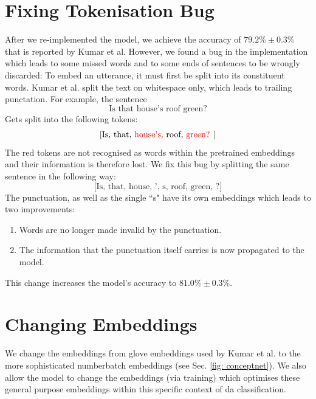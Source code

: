     \section{Fixing Tokenisation Bug \label{sec: method tokenisation bug}}
        After we re-implemented the \gls{model}, we achieve the accuracy of $79.2\% \pm 0.3\%$ that is reported by Kumar et al. However, we found a bug in the implementation which leads to some missed words and to some ends of sentences to be wrongly discarded: To embed an \gls{utterance}, it must first be split into its constituent words. Kumar et al. split the text on whitespace only, which leads to trailing punctation. For example, the sentence
        \begin{equation*}
            \text{Is that house's roof green?}
        \end{equation*}
        Gets split into the following tokens:
        \begin{equation*}
            \text{[Is, that, \color{red} house's, \color{black} roof, \color{red} green? \color{black}]}
        \end{equation*}
        The red tokens are not recognised as words within the pretrained \glspl{embedding} and their information is therefore lost. We fix this bug by splitting the same sentence in the following way:
        \begin{equation*}
            \text{[Is, that, house, ', s, roof, green, ?]}
        \end{equation*}
        The punctuation, as well as the single ``s" have its own \glspl{embedding} which leads to two improvements:
        \begin{enumerate}
            \item Words are no longer made invalid by the punctuation.
            \item The information that the punctuation itself carries is now propagated to the \gls{model}.
        \end{enumerate}
        This change increases the \gls{model}'s accuracy to $81.0\% \pm 0.3\%$.



    \section{Changing Embeddings}
    We change the \glspl{embedding} from \gls{glove} \glspl{embedding} used by Kumar et al.\cite{kumar2017dialogue} to the more sophisticated \gls{numberbatch} \glspl{embedding} (see Sec. \ref{fig: conceptnet}). We also allow the \gls{model} to change the \glspl{embedding} (via training) which optimises these general purpose \glspl{embedding} within this specific context of \gls{da} classification.

